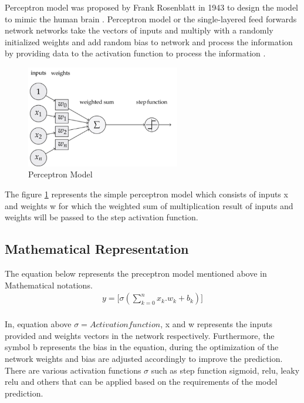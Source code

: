 Perceptron model was proposed by Frank Rosenblatt in 1943 to design the model to 
mimic the human brain \citep{939589}. Perceptron model or the single-layered feed forwards network 
networks take the vectors of inputs and multiply with a randomly 
initialized weights and add random bias to network and process the information by providing data to the
activation function to process the information \citep{AGATONOVICKUSTRIN2000717}.

\begin{figure}[!htp]
    \centering
    \includegraphics[width=0.6\textwidth]{Images/p_model.png} 
    \caption{Perceptron Model}
    \label{figure:perceptron}
\end{figure}
The figure \ref{figure:perceptron} represents the simple perceptron model which consists of inputs x and weights w 
for which the weighted sum of multiplication result of 
inputs and weights will be passed to the step activation function.

\subsection{Mathematical Representation }
\vspace{3mm}
{The equation below represents the preceptron model mentioned above in Mathematical notations.}
\begin{equation}
    \begin{split}
        y = \Big[\sigma(\sum_{k=0}^n x_k.w_k + b_k)\Big] \\
    \end{split}
\end{equation}

     {
        In, equation above ${\sigma = Activation function}$, x and w represents the inputs provided 
        and weights vectors in the network respectively. Furthermore, the symbol b represents the bias in the equation, 
        during the optimization of the network weights and bias are adjusted accordingly to improve the prediction. There are various activation functions ${\sigma}$ such as step function sigmoid, 
        relu, leaky relu and others that can be applied based on the requirements of the model prediction.
    }